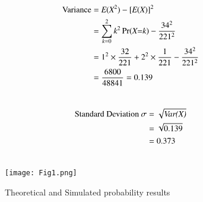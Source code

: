 \documentclass[journal,12pt,twocolumn]{IEEEtran}
\begin{document}
\begin{align}
 \text{Variance} &=\emph{E}(\emph{X}^2) - [\emph{E}(\emph{X})]^2\\ 
                  &= \sum_{\emph{k}=0}^{2} \emph{k}^2 \Pr(\emph{X=k}) - \frac{34^2}{221^2}\\ 
                  &= 1^2\times\frac{32}{221} + 2^2\times\frac{1}{221} - \frac{34^2}{221^2}\\\vspace{0.1cm}
                  &= \frac{6800}{48841} = 0.139\\ \nonumber
\end{align}

\begin{align}
 \text{Standard Deviation }\sigma &= \sqrt{\emph{Var(X)}}\\  
&= \sqrt{0.139}\\ &= 0.373\\ \nonumber
\end{align}

\newpage
\begin{figure}[h!]
    \texttt{[image: Fig1.png]}
    \caption{\large Theoretical and Simulated probability results}
\end{figure}
\end{document}

